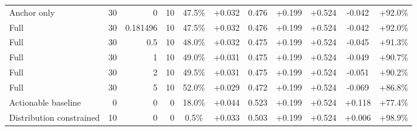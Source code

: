 \begin{table}[htbp]
\begin{tabular}{lrrrccccccc}
Anchor only & 30 & 0 & 10 & 47.5\% & +0.032 & 0.476 & +0.199 & +0.524 & -0.042 & +92.0\% \\
Full & 30 & 0.181496 & 10 & 47.5\% & +0.032 & 0.476 & +0.199 & +0.524 & -0.042 & +92.0\% \\
Full & 30 & 0.5 & 10 & 48.0\% & +0.032 & 0.475 & +0.199 & +0.524 & -0.045 & +91.3\% \\
Full & 30 & 1 & 10 & 49.0\% & +0.031 & 0.475 & +0.199 & +0.524 & -0.049 & +90.7\% \\
Full & 30 & 2 & 10 & 49.5\% & +0.031 & 0.475 & +0.199 & +0.524 & -0.051 & +90.2\% \\
Full & 30 & 5 & 10 & 52.0\% & +0.029 & 0.472 & +0.199 & +0.524 & -0.069 & +86.8\% \\
Actionable baseline & 0 & 0 & 0 & 18.0\% & +0.044 & 0.523 & +0.199 & +0.524 & +0.118 & +77.4\% \\
Distribution constrained & 10 & 0 & 0 & 0.5\% & +0.033 & 0.503 & +0.199 & +0.524 & +0.006 & +98.9\% \\
\bottomrule
\end{tabular}
\end{table}